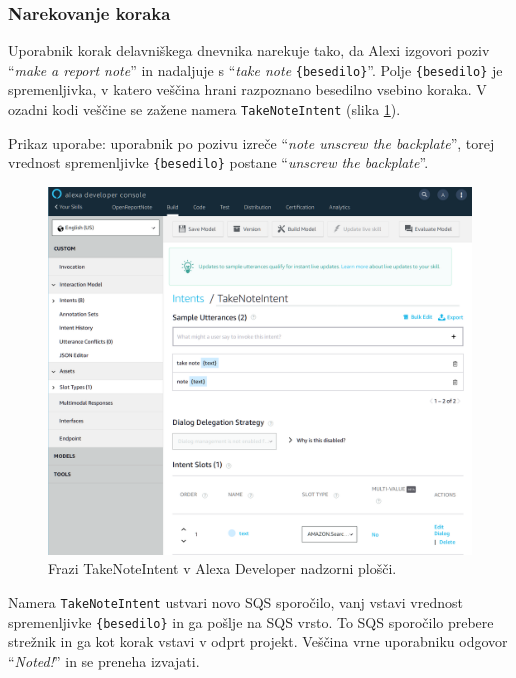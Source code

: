 \documentclass[a4paper, 12pt]{book}
\begin{document}
\subsubsection{Narekovanje koraka}

Uporabnik korak delavniškega dnevnika narekuje tako, da Alexi izgovori poziv \enquote{\textit{make a report note}} in nadaljuje s \enquote{\textit{take note} \texttt{\{besedilo\}}}.
Polje \texttt{\{besedilo\}} je spremenljivka, v katero veščina hrani razpoznano besedilno vsebino koraka.
V ozadni kodi veščine se zažene namera \texttt{TakeNoteIntent} (slika \ref{TakeNoteIntent}).

Prikaz uporabe: uporabnik po pozivu izreče \enquote{\textit{note unscrew the backplate}}, torej vrednost spremenljivke \texttt{\{besedilo\}} postane \enquote{\textit{unscrew the backplate}}.



\begin{figure}[H]
\begin{center}
\includegraphics[width=13cm]{intent_literal}
\end{center}
\caption{Frazi TakeNoteIntent v Alexa Developer nadzorni plošči.}
\label{TakeNoteIntent}
\end{figure}

Namera \texttt{TakeNoteIntent} ustvari novo SQS sporočilo, vanj vstavi vrednost spremenljivke \texttt{\{besedilo\}} in ga pošlje na SQS vrsto. %
To SQS sporočilo prebere strežnik in ga kot korak vstavi v odprt projekt.
Veščina vrne uporabniku odgovor \enquote{\textit{Noted!}} in se preneha izvajati.
\end{document}
